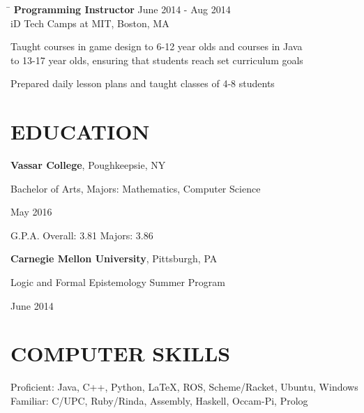 \documentclass{res}
\begin{document}
\begin{resume}
{    \vspace{-12pt}
    \begin{tabbing}
      \hspace{5.65in}\=  \kill %
      {\bf Programming Instructor}
      \>June 2014 - Aug 2014\\
      iD Tech Camps at MIT, Boston, MA\\     
    \end{tabbing}
    \vspace{-24pt}      %
    \begin{list}{\bf{-}}{}
      \setlength{\itemsep}{-2pt}
      \item Taught courses in game design to 6-12 year olds and courses in
            Java\\ to 13-17 year olds, ensuring that students reach set
            curriculum goals
      \item Prepared daily lesson plans and taught classes of 4-8 students
    \end{list}
    \vspace{-4pt}

  \section{\hspace{0.2in}EDUCATION}
    \vspace{3pt} %
    {\bf Vassar College}, Poughkeepsie, NY\\
    \begin{minipage}{5.6in}
      Bachelor of Arts, Majors: Mathematics, Computer Science
    \end{minipage}
    \begin{minipage}{2in}
      May 2016
    \end{minipage}
    G.P.A. Overall: 3.81  Majors: 3.86

    \vspace{-5pt} %
    {\bf Carnegie Mellon University}, Pittsburgh, PA\\
    \begin{minipage}{5.6in}
      Logic and Formal Epistemology Summer Program
    \end{minipage}
    \begin{minipage}{2in}
      June 2014
    \end{minipage}

  \vspace{-3pt}
  \section{\hspace{0.2in}COMPUTER SKILLS}
    \vspace{3pt}
      Proficient: Java, C++, Python, LaTeX, ROS, Scheme/Racket, Ubuntu,
      Windows\\
      Familiar: C/UPC, Ruby/Rinda, Assembly, Haskell, Occam-Pi, Prolog\\

}
\end{resume}
\end{document}
